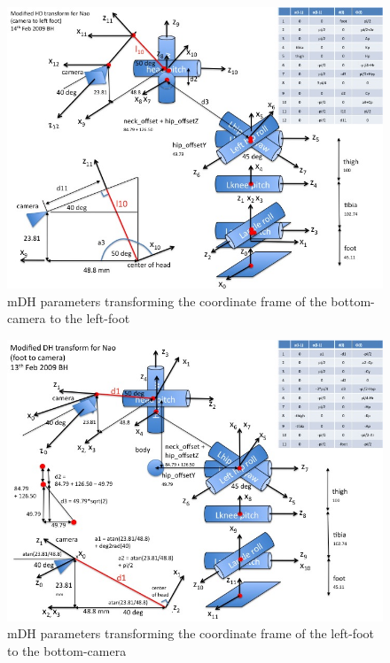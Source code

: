 \documentclass[pdftex,11pt,a4paper]{report}
\begin{document}
\begin{figure}
\centering
\includegraphics[width=1.0\textwidth]{figures/mDH-BottomCameraToLeftFoot.jpg}
\caption{mDH parameters transforming the coordinate frame of the bottom-camera to the left-foot} \label{figmDH-BottomCameraToLeftFoot}
\end{figure}

\begin{figure}
\centering
\includegraphics[width=1.0\textwidth]{figures/mDH-leftFootToBottomCamera.jpg}
\caption{mDH parameters transforming the coordinate frame of the left-foot to the bottom-camera} \label{figmDH-leftFootToBottomCamera}
\end{figure}
\end{document}
